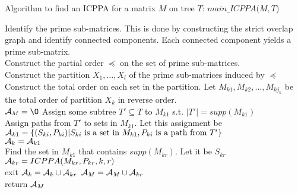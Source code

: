 \documentclass{llncs}
\def\cA{{\cal A}}
\begin{document}
\begin{algorithm}[h]
\caption{Algorithm to find an ICPPA for a matrix $M$ on tree $T$: $main\_ICPPA(M, T$)}
\label{al:icppa-main}
\begin{algorithmic}
\STATE Identify the prime sub-matrices. This is done by constructing the strict overlap graph and identify connected components.  Each connected component yields a prime sub-matrix.   \\
\STATE Construct the partial order $\preccurlyeq$ on the set of prime sub-matrices.  \\
\STATE Construct the partition $X_1,\ldots,X_l$ of the  prime
sub-matrices induced by $\preccurlyeq$ \\
\STATE  Construct the total order on each set in the partition. Let $M_{k1}, M_{k2}, ... , M_{k{j_k}}$ be the total order of
partition $X_k$ in reverse order. \\

$\cA_M = \O$ 
\STATE Assign some subtree $T' \subseteq T$ to $M_{k1}$ s.t. $|T'| =
supp(M_{k1})$ \\
\STATE Assign paths from $T'$ to sets in $M_{k1}$. Let this assignment
be $\cA_{k1} = \{(S_{ki},P_{ki}) | S_{ki} \text{ is a set in }M_{k1}, P_{ki} \text{ is a
  path from }T'\}$\\
$\cA_k = \cA_{k1}$\\

\STATE Find the set in $M_{k1}$ that contains $supp(M_{kr})$. Let it
be $S_{kr}$
 \\
\STATE $\cA_{kr} = ICPPA(M_{kr},P_{kr},k,r)$\\
\IF{$\cA_{kr}$ is invalid}
\STATE  exit
\ENDIF
\STATE $\cA_k = \cA_{k} \cup \cA_{kr}$
\ENDIF
\ENDFOR
\STATE $\cA_M = \cA_M \cup \cA_{kr}$
\ENDFOR\\
return $\cA_M$
\end{algorithmic}
  
\end{algorithm}



\end{document}
